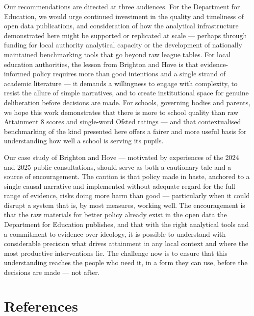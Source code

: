 \documentclass[
  11pt,
]{article}
\begin{document}
Our recommendations are directed at three audiences. For the Department
for Education, we would urge continued investment in the quality and
timeliness of open data publications, and consideration of how the
analytical infrastructure demonstrated here might be supported or
replicated at scale --- perhaps through funding for local authority
analytical capacity or the development of nationally maintained
benchmarking tools that go beyond raw league tables. For local education
authorities, the lesson from Brighton and Hove is that evidence-informed
policy requires more than good intentions and a single strand of
academic literature --- it demands a willingness to engage with
complexity, to resist the allure of simple narratives, and to create
institutional space for genuine deliberation before decisions are made.
For schools, governing bodies and parents, we hope this work
demonstrates that there is more to school quality than raw Attainment 8
scores and single-word Ofsted ratings --- and that contextualised
benchmarking of the kind presented here offers a fairer and more useful
basis for understanding how well a school is serving its pupils.

Our case study of Brighton and Hove --- motivated by experiences of the
2024 and 2025 public consultations, should serve as both a cautionary
tale and a source of encouragement. The caution is that policy made in
haste, anchored to a single causal narrative and implemented without
adequate regard for the full range of evidence, risks doing more harm
than good --- particularly when it could disrupt a system that is, by
most measures, working well. The encouragement is that the raw materials
for better policy already exist in the open data the Department for
Education publishes, and that with the right analytical tools and a
commitment to evidence over ideology, it is possible to understand with
considerable precision what drives attainment in any local context and
where the most productive interventions lie. The challenge now is to
ensure that this understanding reaches the people who need it, in a form
they can use, before the decisions are made --- not after.

\section*{References}\label{references}
\end{document}
